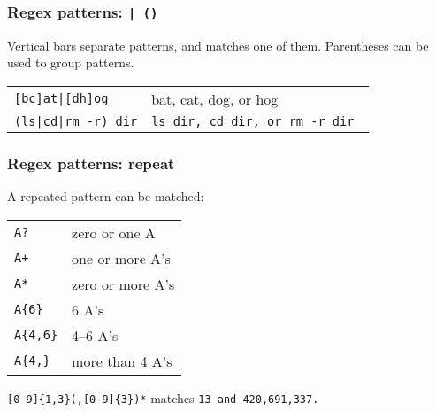 \begin{frame}[fragile]
\frametitle{Regex patterns: \tt{| ()}}
Vertical bars separate patterns, and matches one of them.
Parentheses can be used to group patterns.
\begin{table}
    \centering
    \begin{tabular}{ll}
        \verb![bc]at|[dh]og!        & bat, cat, dog, or hog \\
        \verb!(ls|cd|rm -r) dir!    & \tt{ls dir}, \tt{cd dir}, or \tt{rm -r dir} \\
    \end{tabular}
\end{table}
\end{frame}

\begin{frame}[fragile]
\frametitle{Regex patterns: repeat}
A repeated pattern can be matched:
\begin{table}
    \centering
    \begin{tabular}{ll}
        \verb|A?|           & zero or one A \\
        \verb|A+|           & one or more A's \\  %
        \verb|A*|           & zero or more A's \\ %
        \verb|A{6}|         & 6 A's \\
        \verb|A{4,6}|       & 4--6 A's \\
        \verb|A{4,}|        & more than 4 A's \\
    \end{tabular}
\end{table}

\begin{example}
    \verb|[0-9]{1,3}(,[0-9]{3})*| matches \tt{13} and \tt{420,691,337}.
\end{example}
\end{frame}

